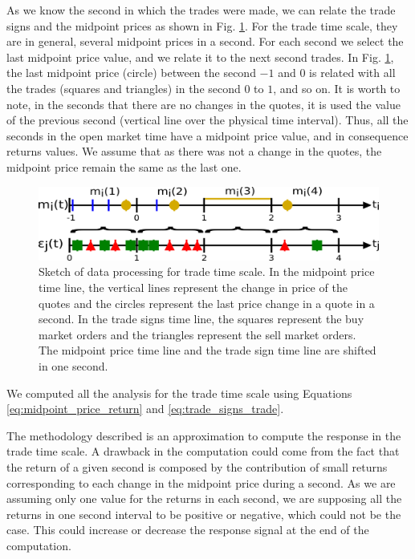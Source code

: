 As we know the second in which the trades were made, we can relate the trade
signs and the midpoint prices as shown in Fig.
\ref{fig:relation_trades_midpoint_trade_scale}. For the trade time scale, they
are in general, several midpoint prices in a second. For each second we
select the last midpoint price value, and we relate it to the next second
trades. In Fig. \ref{fig:relation_trades_midpoint_trade_scale}, the last
midpoint price (circle) between the second $-1$ and $0$ is related with all the
trades (squares and triangles) in the second $0$ to $1$, and so on. It is worth
to note, in the seconds that there are no changes in the quotes, it is used the
value of the previous second (vertical line over the physical time interval).
Thus, all the seconds in the open market time have a midpoint price value, and
in consequence returns values. We assume that as there was not a change in the
quotes, the midpoint price remain the same as the last one.

\begin{figure}[htbp]
    \centering
    \includegraphics[width=\columnwidth]
    {figures/02_relation_trades_quotes_trade_scale.png}
    \caption{Sketch of data processing for trade time scale. In the midpoint
             price time line, the vertical lines represent the change in price
             of the quotes and the circles represent the last price change in a
             quote in a second. In the trade signs time line, the squares
             represent the buy market orders and the triangles represent the
             sell market orders. The midpoint price time line and the trade
             sign time line are shifted in one second.}
    \label{fig:relation_trades_midpoint_trade_scale}
\end{figure}

We computed all the analysis for the trade time scale using Equations
\ref{eq:midpoint_price_return} and \ref{eq:trade_signs_trade}.

The methodology described is an approximation to compute the response in the
trade time scale. A drawback in the computation could come from the fact that
the return of a given second is composed by the contribution of small returns
corresponding to each change in the midpoint price during a second. As we are
assuming only one value for the returns in each second, we are supposing  all
the returns in one second interval to be positive or negative, which could not
be the case. This could increase or decrease the response signal at the end of
the computation.


